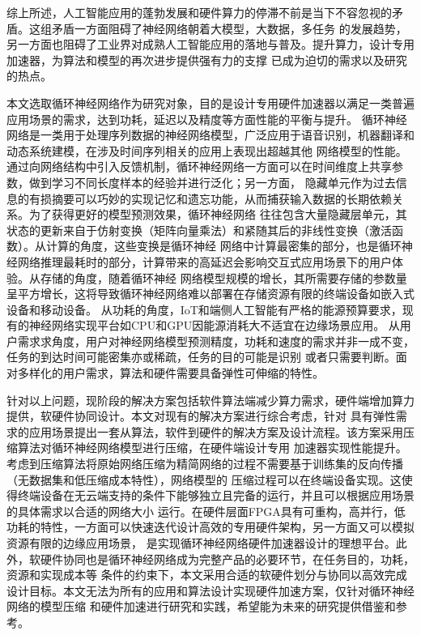 综上所述，人工智能应用的蓬勃发展和硬件算力的停滞不前是当下不容忽视的矛盾。这组矛盾一方面阻碍了神经网络朝着大模型，大数据，多任务
的发展趋势，另一方面也阻碍了工业界对成熟人工智能应用的落地与普及。提升算力，设计专用加速器，为算法和模型的再次进步提供强有力的支撑
已成为迫切的需求以及研究的热点。

本文选取循环神经网络作为研究对象，目的是设计专用硬件加速器以满足一类普遍应用场景的需求，达到功耗，延迟以及精度等方面性能的平衡与提升。
循环神经网络是一类用于处理序列数据的神经网络模型，广泛应用于语音识别，机器翻译和动态系统建模，在涉及时间序列相关的应用上表现出超越其他
网络模型的性能。通过向网络结构中引入反馈机制，循环神经网络一方面可以在时间维度上共享参数，做到学习不同长度样本的经验并进行泛化；另一方面，
隐藏单元作为过去信息的有损摘要可以巧妙的实现记忆和遗忘功能，从而捕获输入数据的长期依赖关系。为了获得更好的模型预测效果，循环神经网络
往往包含大量隐藏层单元，其状态的更新来自于仿射变换（矩阵向量乘法）和紧随其后的非线性变换（激活函数）。从计算的角度，这些变换是循环神经
网络中计算最密集的部分，也是循环神经网络推理最耗时的部分，计算带来的高延迟会影响交互式应用场景下的用户体验。从存储的角度，随着循环神经
网络模型规模的增长，其所需要存储的参数量呈平方增长，这将导致循环神经网络难以部署在存储资源有限的终端设备如嵌入式设备和移动设备。
从功耗的角度，IoT和端侧人工智能有严格的能源预算要求，现有的神经网络实现平台如CPU和GPU因能源消耗大不适宜在边缘场景应用。
从用户需求求角度，用户对神经网络模型预测精度，功耗和速度的需求并非一成不变，任务的到达时间可能密集亦或稀疏，任务的目的可能是识别
或者只需要判断。面对多样化的用户需求，算法和硬件需要具备弹性可伸缩的特性。

针对以上问题，现阶段的解决方案包括软件算法端减少算力需求，硬件端增加算力提供，软硬件协同设计。本文对现有的解决方案进行综合考虑，针对
具有弹性需求的应用场景提出一套从算法，软件到硬件的解决方案及设计流程。该方案采用压缩算法对循环神经网络模型进行压缩，在硬件端设计专用
加速器实现性能提升。考虑到压缩算法将原始网络压缩为精简网络的过程不需要基于训练集的反向传播（无数据集和低压缩成本特性），网络模型的
压缩过程可以在终端设备实现。这使得终端设备在无云端支持的条件下能够独立且完备的运行，并且可以根据应用场景的具体需求以合适的网络大小
运行。在硬件层面FPGA具有可重构，高并行，低功耗的特性，一方面可以快速迭代设计高效的专用硬件架构，另一方面又可以模拟资源有限的边缘应用场景，
是实现循环神经网络硬件加速器设计的理想平台。此外，软硬件协同也是循环神经网络成为完整产品的必要环节，在任务目的，功耗，资源和实现成本等
条件的约束下，本文采用合适的软硬件划分与协同以高效完成设计目标。本文无法为所有的应用和算法设计实现硬件加速方案，仅针对循环神经网络的模型压缩
和硬件加速进行研究和实践，希望能为未来的研究提供借鉴和参考。

